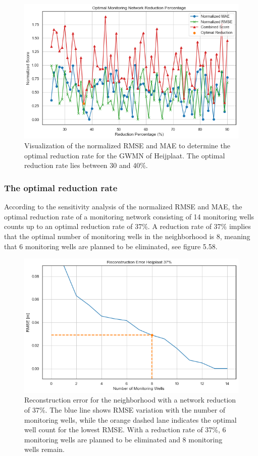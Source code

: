 \clearpage

\begin{figure}[htbp]
    \centering
    \includegraphics[width=0.70\linewidth]{heijopt.png}
    \caption{Visualization of the normalized RMSE and MAE to determine the optimal reduction rate for the GWMN of Heijplaat. The optimal reduction rate lies between 30 and 40\%.}
\end{figure}


\subsubsection{The optimal reduction rate}
According to the sensitivity analysis of the normalized RMSE and MAE, the optimal reduction rate of a monitoring network consisting of 14 monitoring wells counts up to an optimal reduction rate of 37\%. A reduction rate of 37\% implies that the optimal number of monitoring wells in the neighborhood is 8, meaning that 6 monitoring wells are planned to be eliminated, see figure 5.58. 
\begin{figure}[htbp]
    \centering
    \includegraphics[width=0.70\linewidth]{37heij.png}
    \caption{Reconstruction error for the neighborhood with a network reduction of 37\%. The blue line shows RMSE variation with the number of monitoring wells, while the orange dashed lane indicates the optimal well count for the lowest RMSE. With a reduction rate of 37\%, 6 monitoring wells are planned to be eliminated and 8 monitoring wells remain.}
    \label{fig:enter-label}
\end{figure}

